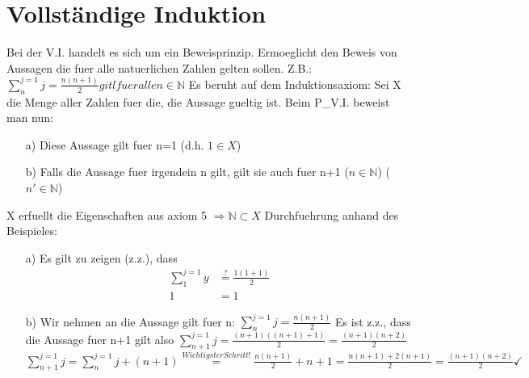 \chapter{Vollständige Induktion}
Bei der V.I. handelt es sich um ein Beweisprinzip. Ermoeglicht den Beweis von Aussagen die fuer alle natuerlichen Zahlen gelten sollen.\newline
Z.B.: $\sum_{n}^{j=1} j = \frac{n(n+1)}{2} gitl fuer alle n \in \mathbb{N}$\newline
Es beruht auf dem Induktionsaxiom:\newline
Sei X die Menge aller Zahlen fuer die, die Aussage gueltig ist.\newline
Beim P\_V.I. beweist man nun:

\begin{enumerate}
\item[a)] Diese Aussage gilt fuer n=1 (d.h. $1 \in X$)
\item[b)] Falls die Aussage fuer irgendein n gilt, gilt sie auch fuer n+1 ($n \in \mathbb{N}$) ($n' \in \mathbb{N}$)
\end{enumerate}
X erfuellt die Eigenschaften aus axiom 5 $\Rightarrow \mathbb{N} \subset X$\newline
Durchfuehrung anhand des Beispieles:
\begin{enumerate}
	\item[a)] Es gilt zu zeigen (z.z.), dass 
		\begin{align*}
		 \sum_{1}^{j=1} y &\stackrel{?}{=} \frac{1 (1+1)}{2}  \\
		 1 &= 1
		\end{align*}
	\item[b)] Wir nehmen an die Aussage gilt fuer n:\newline
		$\sum_{n}^{j=1} j = \frac{n(n+1)}{2}$\newline
		Es ist z.z., dass die Aussage fuer n+1 gilt also
		$\sum_{n+1}^{j=1} j = \frac{(n+1)((n+1)+1)}{2} = \frac{(n+1)(n+2)}{2}$\newline
		$\sum_{n+1}^{j=1} j = \sum_{n}^{j=1} j+(n+1) \stackrel{Wichtigster Schritt!}{=} \frac{n(n+1)}{2} + n + 1 = \frac{n(n+1)+2(n+1)}{2} = \frac{(n+1)(n+2)}{2}\checkmark$
\end{enumerate}